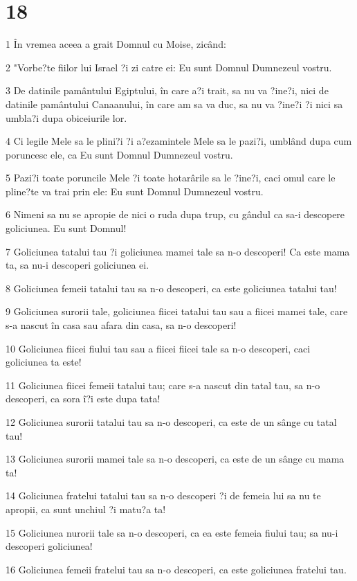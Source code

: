 \chapter{18}

\par 1 În vremea aceea a grait Domnul cu Moise, zicând:
\par 2 "Vorbe?te fiilor lui Israel ?i zi catre ei: Eu sunt Domnul Dumnezeul vostru.
\par 3 De datinile pamântului Egiptului, în care a?i trait, sa nu va ?ine?i, nici de datinile pamântului Canaanului, în care am sa va duc, sa nu va ?ine?i ?i nici sa umbla?i dupa obiceiurile lor.
\par 4 Ci legile Mele sa le plini?i ?i a?ezamintele Mele sa le pazi?i, umblând dupa cum poruncesc ele, ca Eu sunt Domnul Dumnezeul vostru.
\par 5 Pazi?i toate poruncile Mele ?i toate hotarârile sa le ?ine?i, caci omul care le pline?te va trai prin ele: Eu sunt Domnul Dumnezeul vostru.
\par 6 Nimeni sa nu se apropie de nici o ruda dupa trup, cu gândul ca sa-i descopere goliciunea. Eu sunt Domnul!
\par 7 Goliciunea tatalui tau ?i goliciunea mamei tale sa n-o descoperi! Ca este mama ta, sa nu-i descoperi goliciunea ei.
\par 8 Goliciunea femeii tatalui tau sa n-o descoperi, ca este goliciunea tatalui tau!
\par 9 Goliciunea surorii tale, goliciunea fiicei tatalui tau sau a fiicei mamei tale, care s-a nascut în casa sau afara din casa, sa n-o descoperi!
\par 10 Goliciunea fiicei fiului tau sau a fiicei fiicei tale sa n-o descoperi, caci goliciunea ta este!
\par 11 Goliciunea fiicei femeii tatalui tau; care s-a nascut din tatal tau, sa n-o descoperi, ca sora î?i este dupa tata!
\par 12 Goliciunea surorii tatalui tau sa n-o descoperi, ca este de un sânge cu tatal tau!
\par 13 Goliciunea surorii mamei tale sa n-o descoperi, ca este de un sânge cu mama ta!
\par 14 Goliciunea fratelui tatalui tau sa n-o descoperi ?i de femeia lui sa nu te apropii, ca sunt unchiul ?i matu?a ta!
\par 15 Goliciunea nurorii tale sa n-o descoperi, ca ea este femeia fiului tau; sa nu-i descoperi goliciunea!
\par 16 Goliciunea femeii fratelui tau sa n-o descoperi, ca este goliciunea fratelui tau.
